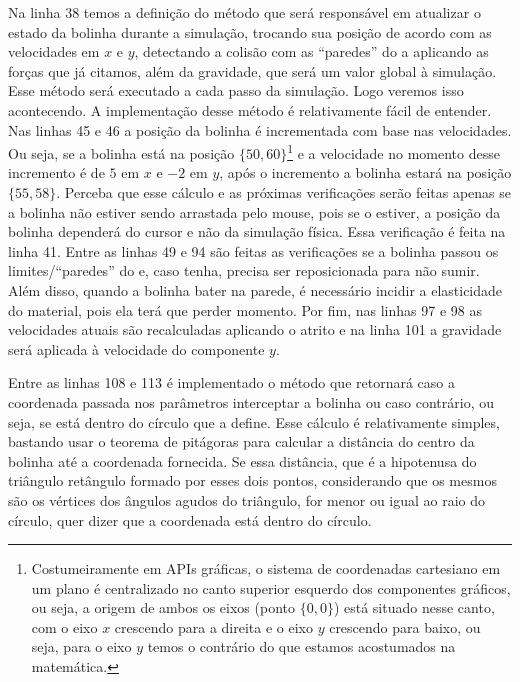 Na linha 38 temos a definição do método  que será responsável em atualizar o estado da bolinha durante a simulação, trocando sua posição de acordo com as velocidades em $x$ e $y$, detectando a colisão com as ``paredes'' do  a aplicando as forças que já citamos, além da gravidade, que será um valor global à simulação. Esse método será executado a cada passo da simulação. Logo veremos isso acontecendo. A implementação desse método é relativamente fácil de entender. Nas linhas 45 e 46 a posição da bolinha é incrementada com base nas velocidades. Ou seja, se a bolinha está na posição $\{50, 60\}$\footnote{Costumeiramente em APIs gráficas, o sistema de coordenadas cartesiano em um plano é centralizado no canto superior esquerdo dos componentes gráficos, ou seja, a origem de ambos os eixos (ponto $\{0, 0\}$) está situado nesse canto, com o eixo $x$ crescendo para a direita e o eixo $y$ crescendo para baixo, ou seja, para o eixo $y$ temos o contrário do que estamos acostumados na matemática.} e a velocidade no momento desse incremento é de $5$ em $x$ e $-2$ em $y$, após o incremento a bolinha estará na posição $\{55, 58\}$. Perceba que esse cálculo e as próximas verificações serão feitas apenas se a bolinha não estiver sendo arrastada pelo mouse, pois se o estiver, a posição da bolinha dependerá do cursor e não da simulação física. Essa verificação é feita na linha 41. Entre as linhas 49 e 94 são feitas as verificações se a bolinha passou os limites/``paredes'' do  e, caso tenha, precisa ser reposicionada para não sumir. Além disso, quando a bolinha bater na parede, é necessário incidir a elasticidade do material, pois ela terá que perder momento. Por fim, nas linhas 97 e 98 as velocidades atuais são recalculadas aplicando o atrito e na linha 101 a gravidade será aplicada à velocidade do componente $y$.

Entre as linhas 108 e 113 é implementado o método  que retornará  caso a coordenada passada nos parâmetros interceptar a bolinha ou  caso contrário, ou seja, se está dentro do círculo que a define. Esse cálculo é relativamente simples, bastando usar o teorema de pitágoras para calcular a distância do centro da bolinha até a coordenada fornecida. Se essa distância, que é a hipotenusa do triângulo retângulo formado por esses dois pontos, considerando que os mesmos são os vértices dos ângulos agudos do triângulo, for menor ou igual ao raio do círculo, quer dizer que a coordenada está dentro do círculo.

